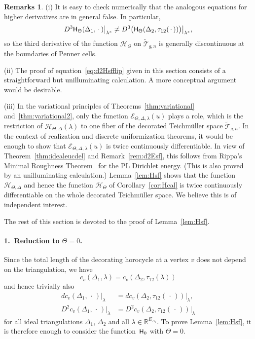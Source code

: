 \documentclass[a4paper, 11pt]{article}
\newcommand{\R}{\mathbb{R}}
\newcommand{\Teich}{\mathcal{T}}
\newcommand{\decTeich}{\widetilde{\Teich}}
\newcommand{\Tm}{Teich\-m{\"u}l\-ler}
\newcommand{\Hcal}{\mathcal{H}}
\newcommand{\Ecal}{\mathcal{E}}
\newcommand{\Hsf}{\scalebox{0.94}{$\mathsf{H}$}}
\theoremstyle{plain}
\theoremstyle{definition}
\newtheorem{remarks}[theorem]{Remarks}
\begin{document}
\begin{remarks}
  \label{rem:difflem}
  (i) It is easy to check numerically that the analogous equations for
  higher derivatives are in general false. In particular,
  \begin{equation*}
    D^{3}\Hsf_{\Theta}(\Delta_{1},\,\cdot\,)\big|_{\lambda^{*}}
    \not=D^{3}\big(\Hsf_{\Theta}(\Delta_{2},\tau_{12}(\,\cdot\,))
      \big)\big|_{\lambda^{*}},
  \end{equation*}
  so the third derivative of the function $\Hcal_{\Theta}$ on
  $\decTeich_{g,n}$ is generally discontinuous at the boundaries of
  Penner cells.

  (ii) The proof of equation~\eqref{eq:d2Hsfflip} given in this
  section consists of a straightforward but unilluminating
  calculation. A more conceptual argument would be desirable.

  (iii) In the variational principles of
  Theorems~\ref{thm:variational} and~\ref{thm:variational2}, only the
  function $\Ecal_{\Theta,\Delta,\lambda}(u)$ plays a role, which is
  the restriction of $\Hcal_{\Theta,\Delta}(\lambda)$ to one fiber of
  the decorated \Tm{} space $\decTeich_{g,n}$. In the context of
  realization and discrete uniformization theorems, it would be enough
  to show that $\Ecal_{\Theta,\Delta,\lambda}(u)$ is twice
  continuously differentiable. In view of
  Theorem~\ref{thm:idealeucdel} and Remark~\ref{rem:d2Esf}, this
  follows from Rippa's Minimal Roughness Theorem~\cite{rippa90} for
  the PL Dirichlet energy. (This is also proved by an unilluminating
  calculation.) Lemma~\ref{lem:Hsf} shows that the function
  $\Hcal_{\Theta,\Delta}$ and hence the function $\Hcal_{\Theta}$ of
  Corollary~\ref{cor:Hcal} is twice continuously differentiable on the
  whole decorated \Tm{} space. We believe this is of independent
  interest.
\end{remarks}

\noindent
The rest of this section is devoted to the proof of
Lemma~\ref{lem:Hsf}.

\paragraph{1.~Reduction to $\Theta=0$.}
Since the total length of the decorating horocycle at a vertex $v$
does not depend on the triangulation, we have
\begin{equation*}
  c_{v}(\Delta_{1},\lambda)=
  c_{v}(\Delta_{2},\tau_{12}(\lambda))
\end{equation*}
and hence trivially also
\begin{align}
  dc_{v}(\Delta_{1},\,\cdot\,)\big|_{\lambda}
  &=dc_{v}(\Delta_{2},\tau_{12}(\,\cdot\,))\big|_{\lambda},\\
  D^{2}c_{v}(\Delta_{1},\,\cdot\,)\big|_{\lambda}
  &=D^{2}c_{v}(\Delta_{2},\tau_{12}(\,\cdot\,))\big|_{\lambda}
\end{align}
for all ideal triangulations $\Delta_{1}$, $\Delta_{2}$ and all
$\lambda\in\R^{E_{\Delta_{1}}}$.  To prove Lemma~\ref{lem:Hsf}, it
is therefore enough to consider the function~$\Hsf_{0}$ with
$\Theta=0$.
\end{document}
